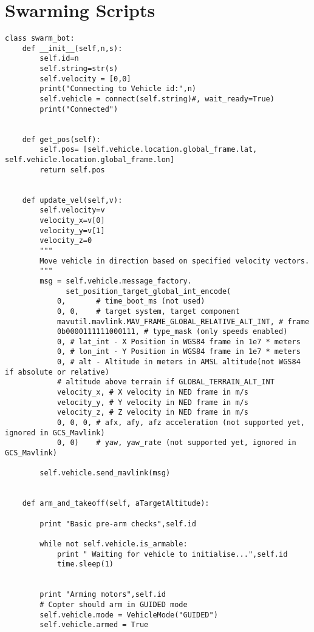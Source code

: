 \newpage
\section{Swarming Scripts}

\begin{lstlisting}
class swarm_bot:
    def __init__(self,n,s):
        self.id=n
        self.string=str(s)
        self.velocity = [0,0]
        print("Connecting to Vehicle id:",n)
        self.vehicle = connect(self.string)#, wait_ready=True)
        print("Connected")


    def get_pos(self):
        self.pos= [self.vehicle.location.global_frame.lat, self.vehicle.location.global_frame.lon]
        return self.pos


    def update_vel(self,v):
        self.velocity=v       
        velocity_x=v[0]
        velocity_y=v[1]
        velocity_z=0
        """
        Move vehicle in direction based on specified velocity vectors.
        """
        msg = self.vehicle.message_factory.
              set_position_target_global_int_encode(
            0,       # time_boot_ms (not used)
            0, 0,    # target system, target component
            mavutil.mavlink.MAV_FRAME_GLOBAL_RELATIVE_ALT_INT, # frame
            0b0000111111000111, # type_mask (only speeds enabled)
            0, # lat_int - X Position in WGS84 frame in 1e7 * meters
            0, # lon_int - Y Position in WGS84 frame in 1e7 * meters
            0, # alt - Altitude in meters in AMSL altitude(not WGS84 if absolute or relative)
            # altitude above terrain if GLOBAL_TERRAIN_ALT_INT
            velocity_x, # X velocity in NED frame in m/s
            velocity_y, # Y velocity in NED frame in m/s
            velocity_z, # Z velocity in NED frame in m/s
            0, 0, 0, # afx, afy, afz acceleration (not supported yet, ignored in GCS_Mavlink)
            0, 0)    # yaw, yaw_rate (not supported yet, ignored in GCS_Mavlink)

        self.vehicle.send_mavlink(msg)
    

    def arm_and_takeoff(self, aTargetAltitude):
 
        print "Basic pre-arm checks",self.id

        while not self.vehicle.is_armable:
            print " Waiting for vehicle to initialise...",self.id
            time.sleep(1)

            
        print "Arming motors",self.id
        # Copter should arm in GUIDED mode
        self.vehicle.mode = VehicleMode("GUIDED")
        self.vehicle.armed = True


\end{lstlisting}
